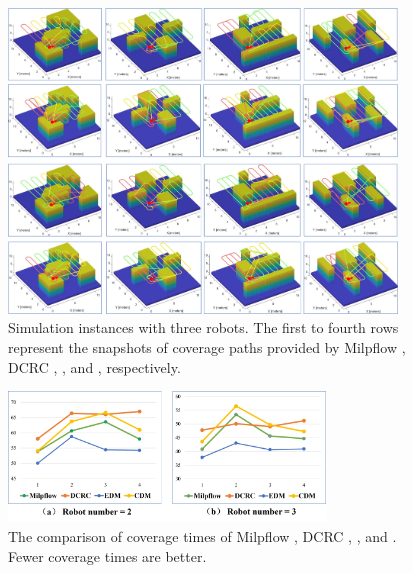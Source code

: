 \documentclass[journal,article,submit,pdftex,moreauthors]{Definitions/mdpi}
\begin{document}
\begin{figure}[htbp] %
	\centering  %
    \vspace{0 cm} %
    \includegraphics[width=0.92\textwidth]{8b.jpg}
    \caption{Simulation instances with three robots. The first to fourth rows represent the snapshots of coverage paths provided by Milpflow \cite{c39}, DCRC \cite{karapetyan2018multi}, , and , respectively.  }
   \label{Fig_8b}
\end{figure}

\begin{figure}[htb] %
	\centering  %
    \vspace{0 cm} %
    \includegraphics[width=0.75\textwidth]{8c.jpg}
    \caption{ The comparison of coverage times of Milpflow \cite{c39}, DCRC \cite{karapetyan2018multi}, , and . Fewer coverage times are better. }
   \label{Fig_8c}
\end{figure}
\end{document}
